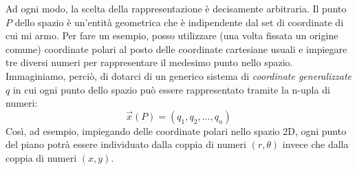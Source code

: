 \documentclass[a4paper,openany]{article}
\begin{document}
	Ad ogni modo, la scelta della rappresentazione è decisamente arbitraria. Il punto $P$ dello spazio è un'entità geometrica che è indipendente dal set di coordinate di cui mi armo. Per fare un esempio, posso utilizzare (una volta fissata un origine comune) coordinate polari al posto delle coordinate cartesiane usuali e impiegare tre diversi numeri per rappresentare il medesimo punto nello spazio. Immaginiamo, perciò, di dotarci di un generico sistema di \textit{coordinate generalizzate }$q$ in cui ogni punto dello spazio può essere rappresentato tramite la n-upla di numeri:
	\begin{equation}
		\vec{x}(P) = (q_{1}, q_{2}, ..., q_{n})
	\end{equation}
	Così, ad esempio, impiegando delle coordinate polari nello spazio 2D, ogni punto del piano potrà essere individuato dalla coppia di numeri $(r, \theta)$ invece che dalla coppia di numeri $(x,y)$.
\end{document}
